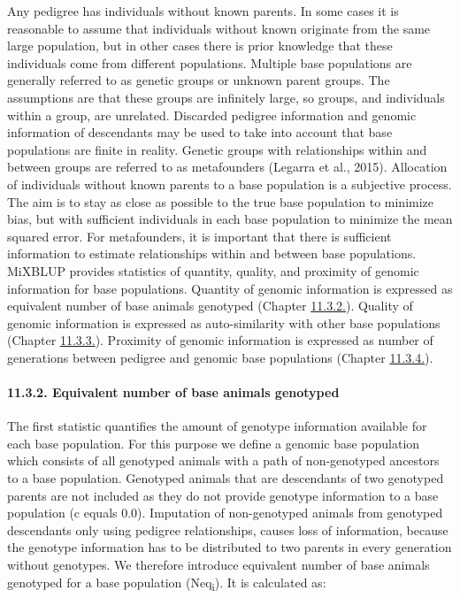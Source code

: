 Any pedigree has individuals without known parents. In some cases it is
reasonable to assume that individuals without known originate from the
same large population, but in other cases there is prior knowledge that
these individuals come from different populations. Multiple base
populations are generally referred to as genetic groups or unknown
parent groups. The assumptions are that these groups are infinitely
large, so groups, and individuals within a group, are unrelated.
Discarded pedigree information and genomic information of descendants
may be used to take into account that base populations are finite in
reality. Genetic groups with relationships within and between groups are
referred to as metafounders (Legarra et al., 2015). Allocation of
individuals without known parents to a base population is a subjective
process. The aim is to stay as close as possible to the true base
population to minimize bias, but with sufficient individuals in each
base population to minimize the mean squared error. For metafounders, it
is important that there is sufficient information to estimate
relationships within and between base populations. MiXBLUP provides
statistics of quantity, quality, and proximity of genomic information
for base populations. Quantity of genomic information is expressed as
equivalent number of base animals genotyped (Chapter
\hyperref[Desc13]{11.3.2.}). Quality of genomic information is expressed
as auto-similarity with other base populations (Chapter
\hyperref[Desc14]{11.3.3.}). Proximity of genomic information is
expressed as number of generations between pedigree and genomic base
populations (Chapter \hyperref[Desc15]{11.3.4.}).

\paragraph{11.3.2. Equivalent number of base animals
genotyped}\label{Desc13}

The first statistic quantifies the amount of genotype information
available for each base population. For this purpose we define a genomic
base population which consists of all genotyped animals with a path of
non-genotyped ancestors to a base population. Genotyped animals that are
descendants of two genotyped parents are not included as they do not
provide genotype information to a base population (c equals 0.0).
Imputation of non-genotyped animals from genotyped descendants only
using pedigree relationships, causes loss of information, because the
genotype information has to be distributed to two parents in every
generation without genotypes. We therefore introduce equivalent number
of base animals genotyped for a base population (Neq\textsubscript{i}).
It is calculated as:

